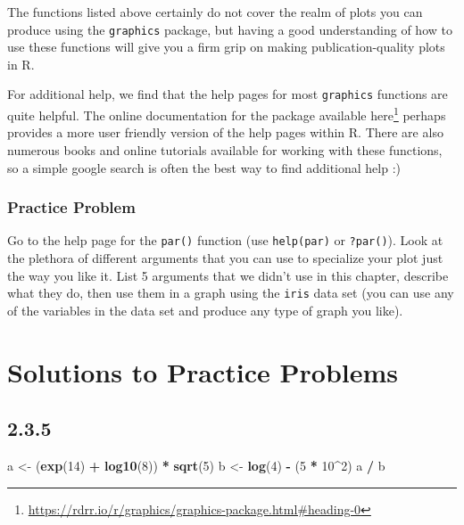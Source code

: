 \documentclass[
]{krantz}
\makeatletter
\newenvironment{Shaded}{\begin{snugshade}}{\end{snugshade}}
\newcommand{\DecValTok}[1]{\textcolor[rgb]{0.06,0.06,0.06}{#1}}
\newcommand{\KeywordTok}[1]{\textcolor[rgb]{0.27,0.27,0.27}{\textbf{#1}}}
\newcommand{\NormalTok}[1]{#1}
\newcommand{\OperatorTok}[1]{\textcolor[rgb]{0.43,0.43,0.43}{\textbf{#1}}}
\newcommand{\StringTok}[1]{\textcolor[rgb]{0.5,0.5,0.5}{#1}}
\renewcommand{\href}[2]{#2\footnote{\url{#1}}}
\newenvironment{kframe}{%
\medskip{}
\setlength{\fboxsep}{.8em}
 \def\at@end@of@kframe{}%
 \ifinner\ifhmode%
  \def\at@end@of@kframe{\end{minipage}}%
  \begin{minipage}{\columnwidth}%
 \fi\fi%
 \def\FrameCommand##1{\hskip\@totalleftmargin \hskip-\fboxsep
 \colorbox{shadecolor}{##1}\hskip-\fboxsep
     \hskip-\linewidth \hskip-\@totalleftmargin \hskip\columnwidth}%
 \MakeFramed {\advance\hsize-\width
   \@totalleftmargin\z@ \linewidth\hsize
   \@setminipage}}%
 {\par\unskip\endMakeFramed%
 \at@end@of@kframe}
\renewenvironment{Shaded}{\begin{kframe}}{\end{kframe}}
\makeatother
\begin{document}
The functions listed above certainly do not cover the realm of plots you can produce using the \texttt{graphics} package, but having a good understanding of how to use these functions will give you a firm grip on making publication-quality plots in R.

For additional help, we find that the help pages for most \texttt{graphics} functions are quite helpful. The online documentation for the package available \href{https://rdrr.io/r/graphics/graphics-package.html\#heading-0}{here} perhaps provides a more user friendly version of the help pages within R. There are also numerous books and online tutorials available for working with these functions, so a simple google search is often the best way to find additional help :)

\hypertarget{graphics14}{%
\subsection{Practice Problem}\label{graphics14}}

Go to the help page for the \texttt{par()} function (use \texttt{help(par)} or \texttt{?par()}). Look at the plethora of different arguments that you can use to specialize your plot just the way you like it. List 5 arguments that we didn't use in this chapter, describe what they do, then use them in a graph using the \texttt{iris} data set (you can use any of the variables in the data set and produce any type of graph you like).

\hypertarget{solutions-to-practice-problems}{%
\chapter{Solutions to Practice Problems}\label{solutions-to-practice-problems}}

\hypertarget{section}{%
\section*{2.3.5}\label{section}}


\begin{Shaded}
\begin{Highlighting}[]
\NormalTok{a \textless{}{-}}\StringTok{ }\NormalTok{(}\KeywordTok{exp}\NormalTok{(}\DecValTok{14}\NormalTok{) }\OperatorTok{+}\StringTok{ }\KeywordTok{log10}\NormalTok{(}\DecValTok{8}\NormalTok{)) }\OperatorTok{*}\StringTok{ }\KeywordTok{sqrt}\NormalTok{(}\DecValTok{5}\NormalTok{)}
\NormalTok{b \textless{}{-}}\StringTok{ }\KeywordTok{log}\NormalTok{(}\DecValTok{4}\NormalTok{) }\OperatorTok{{-}}\StringTok{ }\NormalTok{(}\DecValTok{5} \OperatorTok{*}\StringTok{ }\DecValTok{10}\OperatorTok{\^{}}\DecValTok{2}\NormalTok{)}
\NormalTok{a }\OperatorTok{/}\StringTok{ }\NormalTok{b}
\end{Highlighting}
\end{Shaded}
\end{document}
